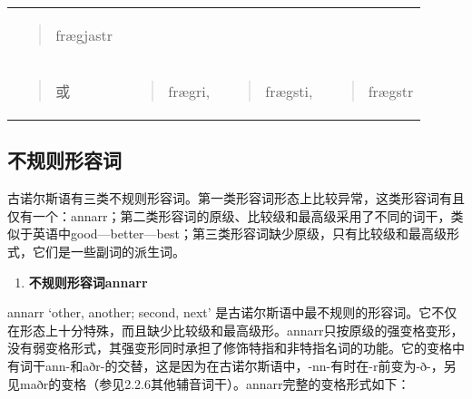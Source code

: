 \begin{longtable}{llll}
\begin{minipage}[t]{\linewidth}
\begin{quote}
frægjastr
\end{quote}
\end{minipage} \\
\begin{minipage}[t]{\linewidth}\raggedright
\begin{quote}
或
\end{quote}
\end{minipage} & \begin{minipage}[t]{\linewidth}\raggedright
\begin{quote}
frægri,
\end{quote}
\end{minipage} & \begin{minipage}[t]{\linewidth}\raggedright
\begin{quote}
frægsti,
\end{quote}
\end{minipage} & \begin{minipage}[t]{\linewidth}\raggedright
\begin{quote}
frægstr
\end{quote}
\end{minipage} \\
\end{longtable}

\subsection{不规则形容词}\label{ux4e0dux89c4ux5219ux5f62ux5bb9ux8bcd}

古诺尔斯语有三类不规则形容词。第一类形容词形态上比较异常，这类形容词有且仅有一个：annarr；第二类形容词的原级、比较级和最高级采用了不同的词干，类似于英语中good---better---best；第三类形容词缺少原级，只有比较级和最高级形式，它们是一些副词的派生词。

\begin{enumerate}
\def\labelenumi{\arabic{enumi})}
\item
  \textbf{不规则形容词annarr}
\end{enumerate}

annarr `other, another; second, next‌'
是古诺尔斯语中最不规则的形容词。它不仅在形态上十分特殊，而且缺少比较级和最高级形。annarr只按原级的强变格变形，没有弱变格形式，其强变形同时承担了修饰特指和非特指名词的功能。它的变格中有词干ann-和aðr-的交替，这是因为在古诺尔斯语中，-nn-有时在-r前变为-ð-，另见maðr的变格（参见2.2.6其他辅音词干）。annarr完整的变格形式如下：

